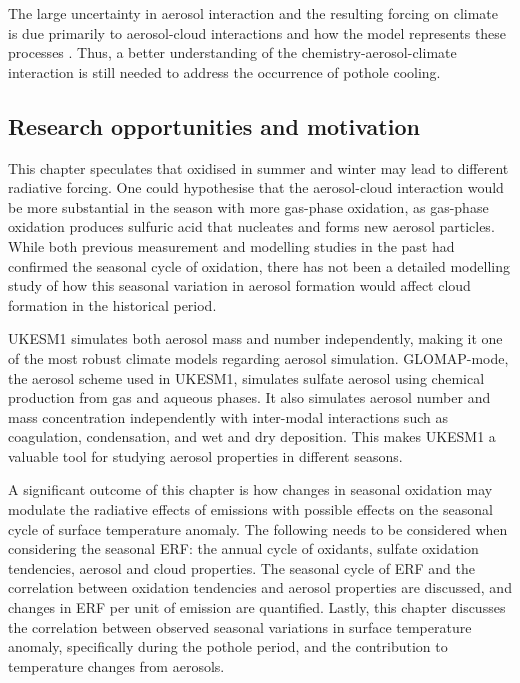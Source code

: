 The large uncertainty in aerosol interaction and the resulting forcing on climate is due primarily to aerosol-cloud interactions and how the model represents these processes \citep{carslawLargeContributionNatural2013,ghanChallengesConstrainingAnthropogenic2016}. Thus, a better understanding of the chemistry-aerosol-climate interaction is still needed to address the occurrence of pothole cooling.


\subsection{Research opportunities and motivation}

This chapter speculates that  oxidised in summer and winter may lead to different radiative forcing. One could hypothesise that the aerosol-cloud interaction would be more substantial in the season with more gas-phase oxidation, as gas-phase oxidation produces sulfuric acid that nucleates and forms new aerosol particles. While both previous measurement and modelling studies in the past had confirmed the seasonal cycle of  oxidation, there has not been a detailed modelling study of how this seasonal variation in aerosol formation would affect cloud formation in the historical period. 

UKESM1 simulates both aerosol mass and number independently, making it one of the most robust climate models regarding aerosol simulation. GLOMAP-mode, the aerosol scheme used in UKESM1, simulates sulfate aerosol using chemical production from gas and aqueous phases. It also simulates aerosol number and mass concentration independently with inter-modal interactions such as coagulation, condensation, and wet and dry deposition. This makes UKESM1 a valuable tool for studying aerosol properties in different seasons.

A significant outcome of this chapter is how changes in seasonal oxidation may modulate the radiative effects of  emissions with possible effects on the seasonal cycle of surface temperature anomaly. The following needs to be considered when considering the seasonal ERF: the annual cycle of oxidants, sulfate oxidation tendencies, aerosol and cloud properties. The seasonal cycle of ERF and the correlation between oxidation tendencies and aerosol properties are discussed, and changes in ERF per unit of  emission are quantified. Lastly, this chapter discusses the correlation between observed seasonal variations in surface temperature anomaly, specifically during the pothole period, and the contribution to temperature changes from aerosols.


